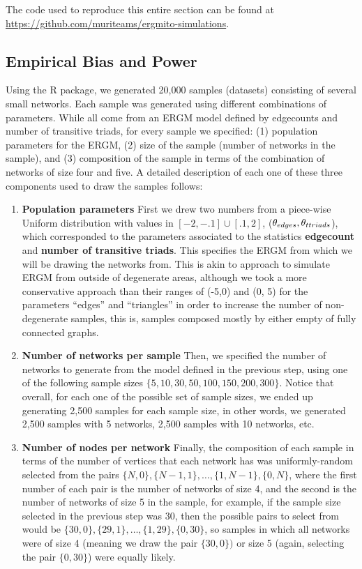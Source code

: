 \documentclass[12pt]{article}
\begin{document}
The code used to reproduce this entire section can be found at \url{https://github.com/muriteams/ergmito-simulations}.

\subsection{\label{subsec:design}Empirical Bias and Power}

Using the \ergmito{} R package, we generated 20,000 samples (datasets) consisting of several small networks. Each sample was generated using different combinations of parameters. While all come from an ERGM model defined by edgecounts and number of transitive triads, for every sample we specified: (1) population parameters for the ERGM, (2) size of the sample (number of networks in the sample), and (3) composition of the sample in terms of the combination of networks of size four and five. A detailed description of each one of these three components used to draw the samples follows:

\begin{enumerate}
\item \textbf{Population parameters} First we drew two numbers from a piece-wise Uniform distribution with values in $[-2, -.1]\cup[.1, 2]$, ($\theta_{edges}, \theta_{ttriads}$), which corresponded to the parameters associated to the statistics \textbf{edgecount} and \textbf{number of transitive triads}. This specifies the ERGM from which we will be drawing the networks from. This is akin to \cite{Schweinberger2015} approach to simulate ERGM from outside of degenerate areas, although we took a more conservative approach than their ranges of (-5,0) and (0, 5) for the parameters ``edges'' and ``triangles'' in order to increase the number of non-degenerate samples, this is, samples composed mostly by either empty of fully connected graphs.

\item \textbf{Number of networks per sample} Then, we specified the number of networks to generate from the model defined in the previous step, using one of the following sample sizes $\{5, 10, 30, 50, 100, 150, 200, 300\}$. Notice that overall, for each one of the possible set of sample sizes, we ended up generating 2,500 samples for each sample size, in other words, we generated 2,500 samples with 5 networks, 2,500 samples with 10 networks, etc.

\item \textbf{Number of nodes per network} Finally, the composition of each sample in terms of the number of vertices that each network has was uniformly-random selected from the pairs $\{N, 0\}, \{N - 1, 1\}, \dots, \{1, N - 1\}, \{0, N\}$, where the first number of each pair is the number of networks of size 4, and the second is the number of networks of size 5 in the sample, for example, if the sample size selected in the previous step was 30, then the possible pairs to select from would be $\{30, 0\}, \{29, 1\}, \dots, \{1, 29\}, \{0, 30\}$, so samples in which all networks were of size 4 (meaning we draw the pair $\{30, 0\})$ or size 5 (again, selecting the pair  $\{0, 30\}$) were equally likely. 
\end{enumerate}
\end{document}
